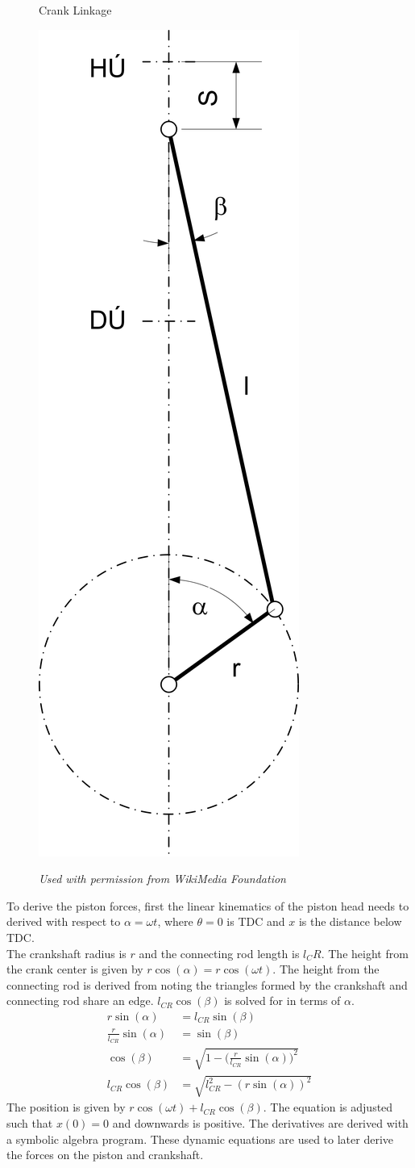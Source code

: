 \documentclass[10pt,a4paper]{article}
\begin{document}
	\begin{figure}
		\centering
		\caption*{Crank Linkage}
		\includegraphics[width=.17\textwidth]{CrankDiagram.png}
		\label{fig:diagram2}
		\caption*{{\tiny \textit{Used with permission from WikiMedia Foundation}}}
		
	\end{figure}
	To derive the piston forces, first the linear kinematics of the piston head needs to derived with respect to $\alpha = \omega t$, where $\theta = 0$ is TDC and $x$ is the distance below TDC. \\
	The crankshaft radius is $r$ and the connecting rod length is $l_CR$. The height from the crank center is given by $r \cos (\alpha) = r \cos (\omega t)$. The height from the connecting rod is derived from noting the triangles formed by the crankshaft and connecting rod share an edge. $l_{CR} \cos (\beta)$ is solved for in terms of $\alpha$.
	\begin{align*}
		r \sin(\alpha) &= l_{CR} \sin (\beta)\\
		\frac{r}{l_{CR}}\sin(\alpha) &= \sin (\beta)\\
		\cos(\beta) &= \sqrt{1 - \Big( \frac{r}{l_{CR}}\sin(\alpha) \Big)^2}\\
		l_{CR} \cos (\beta) &= \sqrt{l_{CR}^2 - (r \sin (\alpha))^2}
	\end{align*}
	The position is given by $r \cos (\omega t) + l_{CR} \cos (\beta)$. The equation is adjusted such that $x(0)=0$ and downwards is positive. The derivatives are derived with a symbolic algebra program. These dynamic equations are used to later derive the forces on the piston and crankshaft.\\
\end{document}
